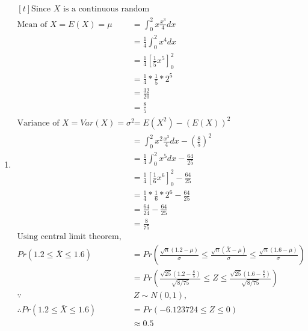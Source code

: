 \documentclass{article}
\begin{document}
\begin{enumerate}
\item 
    $\begin{aligned}[t]
    \text{Since } X \text{ is a continuous random variable,} \\
    \text{Mean of } X = E(X) = \mu &= \int_{0}^2 x \frac{x^3}{4} dx \\
    &= \frac{1}{4} \int_{0}^2 x^4 dx \\
    &= \frac{1}{4} [\frac{1}{5} x^5]_{0}^2 \\
    &= \frac{1}{4} * \frac{1}{5} * 2^5 \\
    &= \frac{32}{20} \\
    &= \frac{8}{5} \\
    \text{Variance of } X = Var(X) = \sigma^2 &= E(X^2) - (E(X))^2 \\
    &= \int_{0}^2 x^2 \frac{x^3}{4} dx - (\frac{8}{5})^2 \\
    &= \frac{1}{4} \int_{0}^2 x^5 dx - \frac{64}{25} \\
    &= \frac{1}{4} [\frac{1}{6} x^6]_{0}^2 - \frac{64}{25} \\
    &= \frac{1}{4} * \frac{1}{6} * 2^6 - \frac{64}{25} \\
    &= \frac{64}{24} - \frac{64}{25} \\
    &= \frac{8}{75} \\
    \text{Using central limit theorem, we have:} \\
    Pr(1.2 \leq \bar{X} \leq 1.6) &= Pr(\frac{\sqrt{n}(1.2 - \mu)}{\sigma} \leq \frac{\sqrt{n}(\bar{X} - \mu)}{\sigma} \leq \frac{\sqrt{n}(1.6 - \mu)}{\sigma}) \\
    &= Pr(\frac{\sqrt{25}(1.2 - \frac{8}{5})}{\sqrt{8/75}} \leq Z \leq \frac{\sqrt{25}(1.6 - \frac{8}{5})}{\sqrt{8/75}}) \\
    \because & \ Z \sim N(0, 1), \\
    \therefore Pr(1.2 \leq \bar{X} \leq 1.6) &= Pr(-6.123724 \leq Z \leq 0) \\
    & \approx 0.5
    \end{aligned}$


\end{enumerate}
\end{document}
